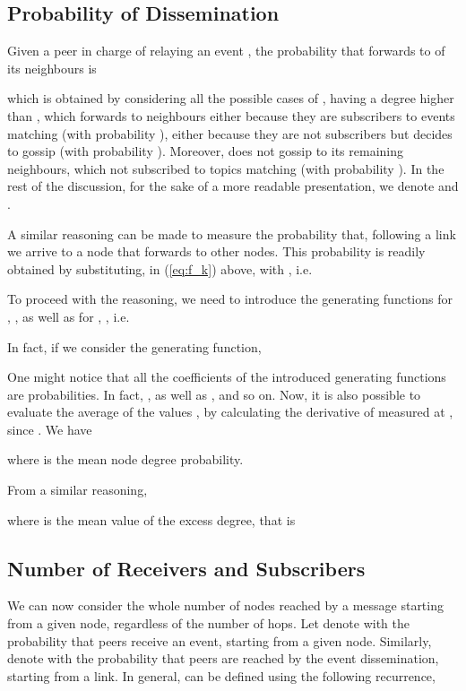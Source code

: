 \documentclass[10pt, conference, compsocconf]{IEEEtran}
\begin{document}
\subsection{Probability of Dissemination}

Given a peer  in charge of relaying an event , the probability that  forwards  to  of its neighbours is

which is obtained by considering all the possible cases of , having a degree higher than , which forwards  to  neighbours either because they are subscribers to events matching  (with probability ), either because they are not subscribers but  decides to gossip  (with probability ). Moreover,  does not gossip  to its remaining  neighbours, which not subscribed to topics matching  (with probability ).
In the rest of the discussion, for the sake of a more readable presentation, we denote  and .

A similar reasoning can be made to measure the probability that, following a link we arrive to a node that forwards  to  other nodes. This probability is readily obtained by substituting, in (\ref{eq:f_k}) above,  with , i.e.



To proceed with the reasoning, we need to introduce the generating functions for , , as well as for , , i.e.

In fact, if we consider the  generating function, 

One might notice that all the coefficients of the introduced generating functions are probabilities. In fact, , as well as , and so on.
Now, it is also possible to evaluate the average of the values , by calculating the derivative of  measured at , since  \cite{Wilf_1994}.
We have

where  is the mean node degree probability.

From a similar reasoning,

where  is the mean value of the excess degree, that is \cite{newmanHandbook}



\subsection{Number of Receivers and Subscribers}

We can now consider the whole number of nodes reached by a message starting from a given node, regardless of the number of hops. Let denote with  the probability that  peers receive an event, starting from a given node. Similarly, denote with  the probability that  peers are reached by the event dissemination, starting from a link. In general,  can be defined using the following recurrence,
\end{document}
